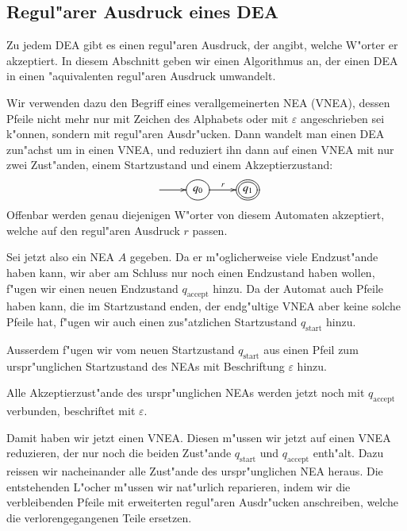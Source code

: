 \subsection{Regul"arer Ausdruck eines DEA\label{regulaer:dea-re}}
Zu jedem DEA gibt es einen regul"aren Ausdruck, der angibt,
welche W"orter er akzeptiert.  In diesem Abschnitt geben
wir einen Algorithmus an, der einen DEA in einen "aquivalenten
regul"aren Ausdruck umwandelt. 

Wir verwenden dazu den Begriff eines verallgemeinerten NEA (VNEA),
dessen Pfeile nicht mehr nur mit Zeichen des Alphabets oder mit
$\varepsilon$ angeschrieben sei k"onnen, sondern mit regul"aren
Ausdr"ucken. Dann wandelt man einen DEA zun"achst um in einen
VNEA, und reduziert ihn dann auf einen VNEA mit nur zwei Zust"anden,
einem Startzustand und einem Akzeptierzustand:
\[
\entrymodifiers={++[o][F]}
\xymatrix{
*+\txt{}\ar[r]
	&{q_0}\ar[r]^{r}
		&*++[o][F=]{q_1}
}
\]
Offenbar werden genau diejenigen W"orter von diesem Automaten
akzeptiert, welche auf den regul"aren Ausdruck $r$ passen.

Sei jetzt also ein NEA $A$ gegeben. Da er m"oglicherweise viele
Endzust"ande haben kann, wir aber am Schluss nur noch einen
Endzustand haben wollen, f"ugen wir einen neuen Endzustand
$q_{\text{accept}}$ hinzu.
Da der Automat auch Pfeile haben kann, die im Startzustand enden,
der endg"ultige VNEA aber keine solche Pfeile hat, f"ugen wir
auch einen zus"atzlichen Startzustand $q_{\text{start}}$ hinzu.


Ausserdem f"ugen wir vom neuen Startzustand $q_{\text{start}}$
aus einen Pfeil zum urspr"unglichen Startzustand des NEAs mit Beschriftung $\varepsilon$ hinzu.

Alle Akzeptierzust"ande des urspr"unglichen NEAs werden jetzt noch mit
$q_{\text{accept}}$ verbunden, beschriftet mit $\varepsilon$.

Damit haben wir jetzt einen VNEA. Diesen
m"ussen wir jetzt auf einen VNEA reduzieren, der nur noch
die beiden Zust"ande $q_{\text{start}}$ und $q_{\text{accept}}$
enth"alt. Dazu reissen wir nacheinander alle Zust"ande des urspr"unglichen
NEA heraus.
Die entstehenden L"ocher m"ussen wir nat"urlich reparieren, indem wir die
verbleibenden Pfeile mit erweiterten regul"aren Ausdr"ucken
anschreiben, welche die verlorengegangenen Teile ersetzen.

